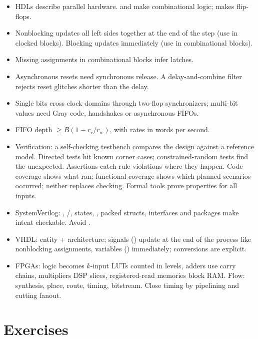 \begin{itemize}
  \item HDLs describe parallel hardware.  and  make combinational logic;  makes flip-flops.
  \item Nonblocking \code{<=} updates all left sides together at the end of the step (use in clocked blocks). Blocking \code{=} updates immediately (use in combinational blocks).
  \item Missing assignments in combinational blocks infer latches.
  \item Asynchronous resets need synchronous release. A delay-and-combine filter rejects reset glitches shorter than the delay.
  \item Single bits cross clock domains through two-flop synchronizers; multi-bit values need Gray code, handshakes or asynchronous FIFOs.
  \item FIFO depth $\ge B(1 - r_r/r_w)$, with rates in words per second.
  \item Verification: a self-checking testbench compares the design against a reference model. Directed tests hit known corner cases; constrained-random tests find the unexpected. Assertions catch rule violations where they happen. Code coverage shows what ran; functional coverage shows which planned scenarios occurred; neither replaces checking. Formal tools prove properties for all inputs.
  \item SystemVerilog: , /,  states, , packed structs, interfaces and packages make intent checkable. Avoid .
  \item VHDL: entity + architecture; signals (\code{<=}) update at the end of the process like nonblocking assignments, variables (\code{:=}) immediately; conversions are explicit.
  \item FPGAs: logic becomes $k$-input LUTs counted in levels, adders use carry chains, multipliers DSP slices, registered-read memories block RAM. Flow: synthesis, place, route, timing, bitstream. Close timing by pipelining and cutting fanout.
\end{itemize}

\section{Exercises}


